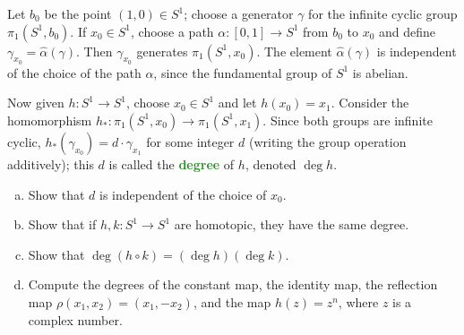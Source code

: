 \documentclass[10pt]{article}
\providecommand{\ii}{\item}
\providecommand{\vocab}[1]{{\textbf{\textcolor{ForestGreen}{#1}}}}
\begin{document}
\begin{problem}
    Let $b_0$ be the point $(1,0)\in S^1$;
    choose a generator $\gamma$ for the infinite cyclic group $\pi_1(S^1,b_0)$.
    If $x_0\in S^1$, choose a path $\alpha\colon[0,1]\to S^1$ from $b_0$ to $x_0$
    and define $\gamma_{x_0} = \widehat\alpha(\gamma)$.
    Then $\gamma_{x_0}$ generates $\pi_1(S^1,x_0)$.
    The element $\widehat\alpha(\gamma)$ is independent
    of the choice of the path $\alpha$,
    since the fundamental group of $S^1$ is abelian.

    Now given $h\colon S^1\to S^1$, choose $x_0\in S^1$ and let $h(x_0) = x_1$.
    Consider the homomorphism $h_*\colon\pi_1(S^1,x_0)\to\pi_1(S^1,x_1)$.
    Since both groups are infinite cyclic,
    $h_*(\gamma_{x_0}) = d\cdot\gamma_{x_1}$ for some integer $d$
    (writing the group operation additively);
    this $d$ is called the \vocab{degree} of $h$,
    denoted $\deg h$.
    \begin{enumerate}[(a)]
        \ii Show that $d$ is independent of the choice of $x_0$.
	\ii Show that if $h,k\colon S^1\to S^1$ are homotopic,
	they have the same degree.
	\ii Show that $\deg(h\circ k) = (\deg h)(\deg k)$.
	\ii Compute the degrees of the constant map, the identity map,
	the reflection map $\rho(x_1,x_2) = (x_1,-x_2)$,
	and the map $h(z) = z^n$, where $z$ is a complex number.
    \end{enumerate}
\end{problem}
\end{document}
